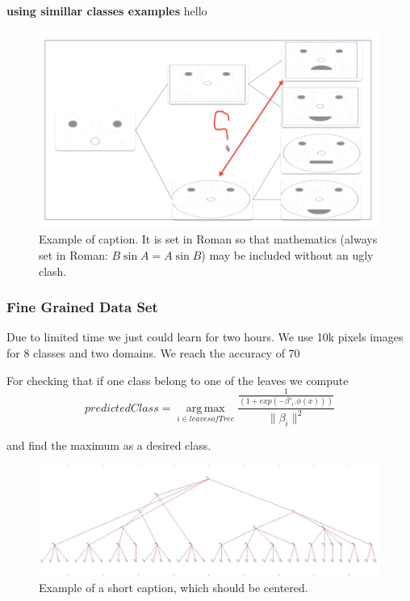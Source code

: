 \documentclass[10pt,twocolumn,letterpaper]{article}
\begin{document}
\textbf{using simillar classes examples}
hello

   
   
 \begin{figure}[t]
 	\begin{center}
 		\includegraphics[width=0.8\linewidth]{merge}
 	\end{center}
 	\caption{Example of caption.  It is set in Roman so that mathematics
 		(always set in Roman: $B \sin A = A \sin B$) may be included without an
 		ugly clash.}
 	\label{fig:long}
 	\label{fig:onecol}
 \end{figure}
 
 


 \subsubsection{Fine Grained Data Set}
Due to limited time we just could learn for two hours. We use 10k pixels images for 8 classes and two domains. We reach the accuracy of 70%

For checking that if one class belong to one of the leaves we compute 
\begin{displaymath}
predictedClass = \operatorname*{arg\,max}_{i \in leaves of Tree} 
\frac{\frac{1}{(1+exp(-\beta'_i.\phi(x)))}}{\|\beta_i\|^2}
\end{displaymath}  

and find the maximum as a desired class.


\begin{figure}
	\begin{center}
	    \includegraphics[width=1\linewidth]{carsDogs.png}
	\end{center}
	\caption{Example of a short caption, which should be centered.}
	\label{fig:short}
\end{figure}
{\small


}
\end{document}
